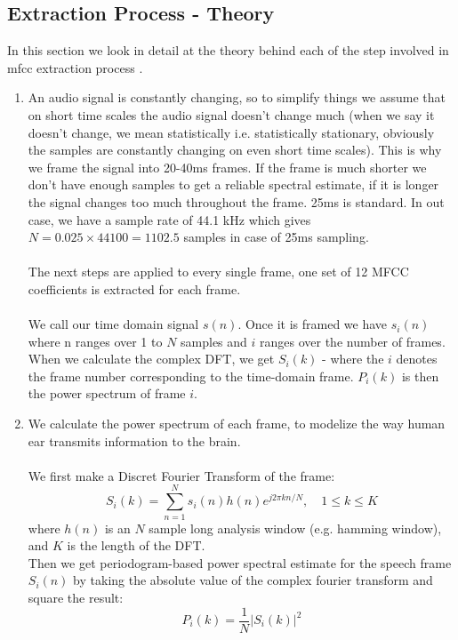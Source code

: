 \documentclass{article} %
\begin{document}
    \subsection{Extraction Process - Theory}
	In this section we look in detail at the theory behind each of the step involved in mfcc extraction process \cite{cite7}.
	\begin{enumerate}
		\item An audio signal is constantly changing, so to simplify things we assume that on short time scales the audio signal doesn't change much (when we say it doesn't change, we mean statistically i.e. statistically stationary, obviously the samples are constantly changing on even short time scales). This is why we frame the signal into 20-40ms frames. If the frame is much shorter we don't have enough samples to get a reliable spectral estimate, if it is longer the signal changes too much throughout the frame. 25ms is standard. In out case, we have a sample rate of 44.1 kHz which gives $N = 0.025 \times 44100 = 1102.5$ samples in case of 25ms sampling.\\\\
        The next steps are applied to every single frame, one set of 12 MFCC coefficients is extracted for each frame.\\\\ 
        We call our time domain signal $s(n)$. Once it is framed we have $s_i(n)$ where n ranges over 1 to $N$ samples and $i$ ranges over the number of frames. When we calculate the complex DFT, we get $S_i(k)$ - where the $i$ denotes the frame number corresponding to the time-domain frame. $P_i(k)$ is then the power spectrum of frame $i$.\\
        
		\item We calculate the power spectrum of each frame, to modelize the way human ear transmits information to the brain.\\\\
		We first make a Discret Fourier Transform of the frame:\\
		$$S_i(k) = \displaystyle\sum_{n=1}^N s_i(n)h(n)e^{j2\pi kn /N}, \quad 1 \leq k \leq K$$
		where $h(n)$ is an $N$ sample long analysis window (e.g. hamming window), and $K$ is the length of the DFT.\\
		Then we get periodogram-based power spectral estimate for the speech frame $S_i(n)$ by taking the absolute value of the complex fourier transform and square the result:\\
		$$P_i(k) = \frac{1}{N} |S_i(k)|^2$$


\end{enumerate}
\end{document}
